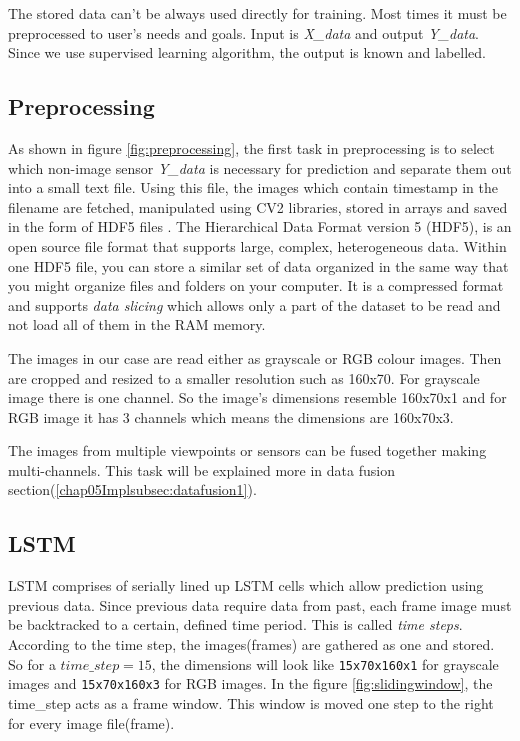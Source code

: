 The stored data can't be always used directly for training. Most times it must be
preprocessed to user's needs and goals. Input is \textit{X\_{data}} and output
\textit{Y\_{data}}. Since we use supervised learning algorithm, the output is known and
labelled.

\subsection{Preprocessing}
As shown in figure \ref{fig:preprocessing}, the first task in preprocessing is to select which non-image sensor \textit{Y\_{data}} is necessary for prediction
and separate them out into a small text file. Using this file, the images which contain
timestamp in the filename are fetched, manipulated using CV2 libraries, stored in arrays and saved in the form of HDF5 files
\cite{hdf5file}. The Hierarchical Data Format version 5 (HDF5), is an open source file format
that supports large, complex, heterogeneous data. Within one HDF5 file, you can store a similar set of data organized in the same way that you might organize files and folders on your computer.
It is a compressed format and supports \textit{data slicing} which allows only a part of
the dataset to be read and not load all of them in the RAM memory.

The images in our case are read either as grayscale or RGB colour images. Then are cropped
and resized to a smaller resolution such as 160x70. For grayscale image there is one
channel. So the image's dimensions resemble 160x70x1 and for RGB image it has 3 channels
which means the dimensions are 160x70x3.

The images from multiple viewpoints or sensors can be fused together making
multi-channels. This task will be explained more in data fusion
section(\ref{chap05Implsubsec:datafusion1}).

\subsection{LSTM}

LSTM comprises of serially lined up LSTM cells which allow prediction using previous
data. Since previous data require data from past, each frame image must be backtracked to
a certain, defined time period. This is called \textit{time steps}. According to the time
step, the images(frames) are gathered as one and stored. So for a $time\_step = 15$, the
dimensions will look like \texttt{15x70x160x1} for grayscale images and \texttt{15x70x160x3} for RGB
images. In the figure \ref{fig:slidingwindow}, the time\_step acts as a frame window. This
window is moved one step to the right for every image file(frame).

